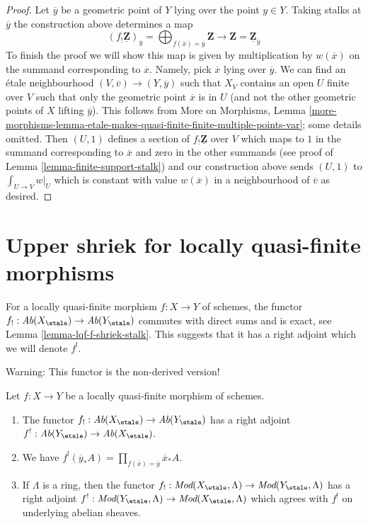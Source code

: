 \begin{proof}
\medskip\noindent
Let $\overline{y}$ be a geometric point of $Y$ lying over the point $y \in Y$.
Taking stalks at $\overline{y}$ the construction above determines a map
$$
(f_!\underline{\mathbf{Z}})_{\overline{y}}
= \bigoplus\nolimits_{f(\overline{x}) = \overline{y}} \mathbf{Z}
\longrightarrow
\mathbf{Z} = \underline{\mathbf{Z}}_{\overline{y}}
$$
To finish the proof we will show this map is given by multiplication by
$w(\overline{x})$ on the summand corresponding to $\overline{x}$.
Namely, pick $\overline{x}$ lying over $\overline{y}$.
We can find an \'etale neighbourhood $(V, \overline{v}) \to (Y, \overline{y})$
such that $X_V$ contains an open $U$ finite over $V$
such that only the geometric point $\overline{x}$ is in $U$
(and not the other geometric points of $X$ lifting $\overline{y}$).
This follows from More on Morphisms, Lemma
\ref{more-morphisms-lemma-etale-makes-quasi-finite-finite-multiple-points-var};
some details omitted. Then $(U, 1)$ defines a section of
$f_!\underline{\mathbf{Z}}$ over $V$ which maps to $1$ in the summand
corresponding to $\overline{x}$ and zero in the other summands
(see proof of Lemma \ref{lemma-finite-support-stalk}) and
our construction above sends $(U, 1)$ to $\int_{U \to V} w|_U$
which is constant with value $w(\overline{x})$ in a neighbourhood
of $\overline{v}$ as desired.
\end{proof}










\section{Upper shriek for locally quasi-finite morphisms}
\label{section-duality-locally-quasi-finite}

\noindent
For a locally quasi-finite morphism $f : X \to Y$ of schemes, the
functor $f_! : \textit{Ab}(X_\etale) \to \textit{Ab}(Y_\etale)$ commutes
with direct sums and is exact, see Lemma \ref{lemma-lqf-f-shriek-stalk}.
This suggests that it has a right adjoint which we will denote $f^!$.

\medskip\noindent
Warning: This functor is the non-derived version!

\begin{lemma}
\label{lemma-lqf-f-upper-shriek}
Let $f : X \to Y$ be a locally quasi-finite morphism of schemes.
\begin{enumerate}
\item The functor $f_! : \textit{Ab}(X_\etale) \to \textit{Ab}(Y_\etale)$
has a right adjoint $f^! : \textit{Ab}(Y_\etale) \to \textit{Ab}(X_\etale)$.
\item We have
$f^!(\overline{y}_*A) = \prod_{f(\overline{x}) = \overline{y}} \overline{x}_*A$.
\item If $\Lambda$ is a ring, then the functor
$f_! : \textit{Mod}(X_\etale, \Lambda) \to \textit{Mod}(Y_\etale, \Lambda)$
has a right adjoint
$f^! : \textit{Mod}(Y_\etale, \Lambda) \to \textit{Mod}(X_\etale, \Lambda)$
which agrees with $f^!$ on underlying abelian sheaves.
\end{enumerate}
\end{lemma}

